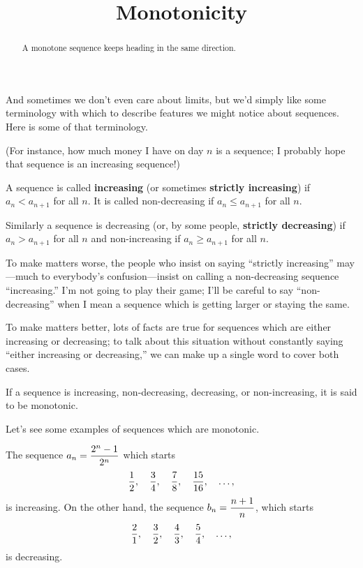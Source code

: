 \documentclass{ximera}
\title{Monotonicity}
\newcommand{\defnword}[1]{\textbf{#1}}
\newcommand{\ds}{\displaystyle}
\renewcommand{\index}[1]{}
\renewcommand{\label}[1]{}
\begin{document}
\begin{abstract}
  A monotone sequence keeps heading in the same direction.
\end{abstract}

\maketitle

\label{subsection:monotonicity}

And sometimes we don't even care about limits, but we'd simply like
some terminology with which to describe features we might notice about
sequences.  Here is some of that terminology.

(For instance, how much money I have on day $n$ is a sequence; I
probably hope that sequence is an increasing sequence!)

\begin{definition}
  A sequence is called
  \defnword{increasing}\index{sequence!increasing} (or sometimes
  \defnword{strictly increasing}) if $\ds a_n<a_{n+1}$ for all $n$.
  It is called {\dfont
    non-decreasing\index{sequence!non-decreasing}\/} if $\ds a_n\le
  a_{n+1}$ for all $n$.

  Similarly a sequence is {\dfont
    decreasing\index{sequence!decreasing}\/} (or, by some people,
  \defnword{strictly decreasing}) if $\ds a_n>a_{n+1}$ for all $n$ and
  {\dfont non-increasing\index{sequence!non-increasing}\/} if $\ds
  a_n\ge a_{n+1}$ for all $n$.
\end{definition}
To make matters worse, the people who insist on saying ``strictly
increasing'' may---much to everybody's confusion---insist on calling a
non-decreasing sequence ``increasing.'' I'm not going to play their
game; I'll be careful to say ``non-decreasing'' when I mean a sequence
which is getting larger or staying the same.

To make matters better, lots of facts are true for sequences which are
either increasing or decreasing; to talk about this situation without
constantly saying ``either increasing or decreasing,'' we can make up
a single word to cover both cases.
\begin{definition}
  If a sequence is increasing, non-decreasing, decreasing, or
  non-increasing, it is said to be {\dfont
    monotonic\index{sequence!monotonic}\/}.
\end{definition}


Let's see some examples of sequences which are monotonic.
\begin{example}
The sequence $\ds a_n = {2^n-1\over2^n}$ which starts
$$
  {1\over2},\quad {3\over4},\quad {7\over8},\quad {15\over16},\quad \ldots,
$$
is increasing.  On the other hand, the sequence $\ds b_n = {n+1\over n}$, which starts
$$ 
  {2\over1},\quad{3\over2},\quad{4\over3},\quad{5\over4},\quad\ldots,
$$
is decreasing.
\end{example}
\end{document}

